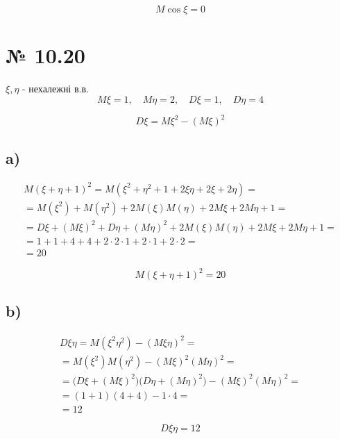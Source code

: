\documentclass[11pt, a4paper]{article} %
\begin{document}
\begin{mdframed}[style=ans]
    $$M\cos\xi =0$$
\end{mdframed}

\section*{№ 10.20}
\begin{mdframed}
    $\xi, \eta$ - нехалежні в.в.\\
    $$M\xi = 1, \quad M\eta = 2, \quad D\xi = 1, \quad D\eta = 4$$
\end{mdframed}

\begin{mdframed}[backgroundcolor=violet!15]
    $$D\xi = M\xi^2 - (M\xi)^2$$
\end{mdframed}

\subsection*{a)}
$$\begin{gathered}
    M(\xi+\eta+1)^2 = M(\xi^2 + \eta^2 + 1 + 2\xi\eta + 2\xi + 2\eta) = \\
    = M(\xi^2) + M(\eta^2) + 2M(\xi)M(\eta) + 2M\xi + 2M\eta + 1 = \\
    = D\xi+(M\xi)^2 + D\eta + (M\eta)^2 + 2M(\xi)M(\eta) + 2M\xi +2M\eta + 1 = \\
    = 1 + 1 + 4 + 4 + 2\cdot2\cdot1 + 2\cdot 1 + 2\cdot 2 = \\
    = 20
\end{gathered} $$
\begin{mdframed}[style=ans]
    $$M(\xi+\eta+1)^2 = 20$$
\end{mdframed}

\subsection*{b)}
$$\begin{gathered}
    D\xi\eta = M(\xi^2\eta^2) - (M\xi\eta)^2 = \\
    = M(\xi^2) M(\eta^2) - (M\xi)^2(M\eta)^2 = \\
    = \bigl(D\xi+(M\xi)^2\bigr)\bigl( D\eta + (M\eta)^2\bigr) - (M\xi)^2(M\eta)^2 = \\
    = (1 + 1)(4 + 4) - 1\cdot 4 = \\
    = 12
\end{gathered}$$
\begin{mdframed}[style=ans]
    $$D\xi\eta = 12$$
\end{mdframed}
\pagebreak
\end{document}
